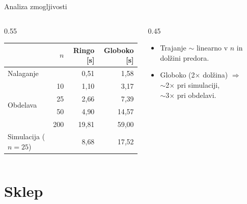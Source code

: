 \documentclass[11pt,aspectratio=169]{beamer}
\begin{document}
\begin{frame}{Analiza zmogljivosti}
    \begin{columns}[T]
        \begin{column}{0.55\textwidth}
            \scriptsize
            \begin{tabular}{lrrr}
                \toprule
                & $n$ & \textbf{Ringo [s]} & \textbf{Globoko [s]} \\
                \midrule
                Nalaganje & & 0{,}51 & 1{,}58 \\
                \midrule
                \multirow{4}{*}{Obdelava} & 10 & 1{,}10 & 3{,}17 \\
                & 25 & 2{,}66 & 7{,}39 \\
                & 50 & 4{,}90 & 14{,}57 \\
                & 200 & 19{,}81 & 59{,}00 \\
                \midrule
                Simulacija ($n=25$) & & 8{,}68 & 17{,}52 \\
                \bottomrule
            \end{tabular}
        \end{column}
        \begin{column}{0.45\textwidth}
            \begin{itemize}
                \item Trajanje $\sim$ linearno v $n$ in dolžini predora.
                \item Globoko (2$\times$ dolžina) $\Rightarrow$\\ $\sim$2$\times$ pri simulaciji,\\ $\sim$3$\times$ pri obdelavi.
            \end{itemize}
        \end{column}
    \end{columns}
\end{frame}

\section{Sklep}
\end{document}
